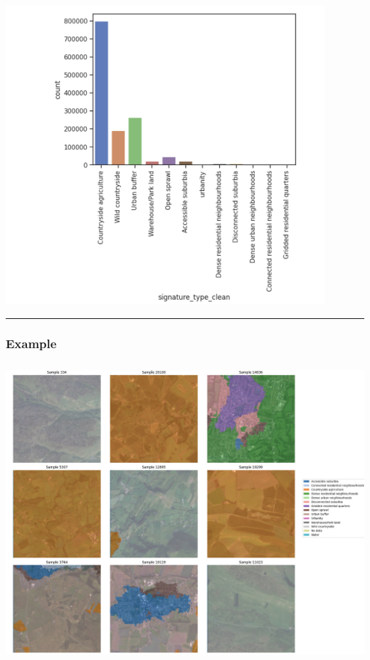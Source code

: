 \documentclass[
  letterpaper,
  DIV=11,
  numbers=noendperiod]{scrartcl}
\begin{document}
\begin{center}
\includegraphics[width=\textwidth,height=4.375in]{../figures/algo_design/unbalanced.png}
\end{center}

\begin{center}\rule{0.5\linewidth}{0.5pt}\end{center}

\subsubsection{Example}\label{example}

\begin{center}
\includegraphics[width=\textwidth,height=4.375in]{../figures/algo_design/random_sample.png}
\end{center}
\end{document}
